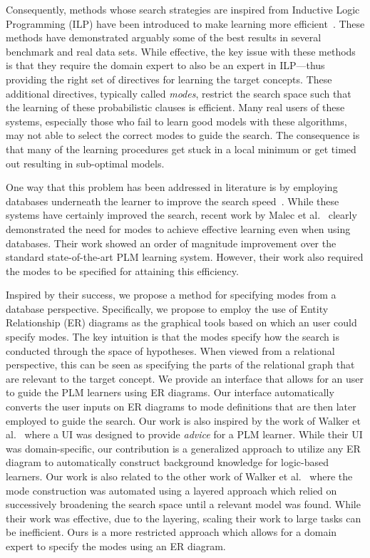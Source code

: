 \documentclass[sigconf]{acmart}
\begin{document}
Consequently, methods whose search strategies are inspired from Inductive Logic Programming (ILP) have been introduced to make learning more efficient~\cite{natarajan2015boosted,natarajan10}. These methods have demonstrated arguably some of the best results in several benchmark and real data sets. While effective, the key issue with these methods is that they require the domain expert to also be an expert in ILP---thus providing the right set of directives for learning the target concepts. These additional directives, typically
called {\em modes}, restrict the search space such that the learning of these probabilistic clauses is efficient. Many real users of these systems, especially those who fail to learn good models with these algorithms, may not able to select the correct modes to guide the search. 
The consequence is that many of the learning procedures get stuck in a local minimum or get timed out resulting in sub-optimal models.

One way that this problem has been addressed in literature is by employing databases underneath the learner to improve the search speed~\cite{malec2016inductive,zeng2014quickfoil,niuvldb11}. While these systems have certainly improved the search, recent work by Malec et al.~\cite{malec2016inductive} clearly demonstrated the need for modes to achieve effective learning even when using databases. Their work showed an order of magnitude improvement over the standard state-of-the-art PLM learning system. However, their work also required the modes to be specified for attaining this efficiency. 

Inspired by their success, we propose a method for specifying modes from a database perspective. Specifically, we propose to employ the use of Entity Relationship (ER) diagrams  as the graphical tools based on which an user could specify modes. The key intuition is that the modes specify how the search is conducted through the space of hypotheses. When viewed from a relational perspective, this can be seen as specifying the parts of the relational graph that are relevant to the target concept. We provide an interface that allows for an user to guide the PLM learners using ER diagrams. Our interface automatically converts the user inputs on ER diagrams to mode definitions that are then later employed to guide the search. Our work is also inspired by the work of Walker et al.~\cite{walker2011integrating} where a UI was designed to provide {\em advice} for 
a PLM learner. While their UI was domain-specific, our contribution is a generalized approach to utilize any ER diagram to automatically construct background knowledge for logic-based learners. Our work is also related to the other work of Walker et al.~\cite{walker2010automating} where the mode construction was automated using a layered approach which relied on successively broadening the search space until a relevant model was found.  While their work was effective, due to the layering, scaling their work to large tasks can be inefficient. Ours is a more restricted approach which allows for a domain expert to specify the modes using an ER diagram.
\end{document}
